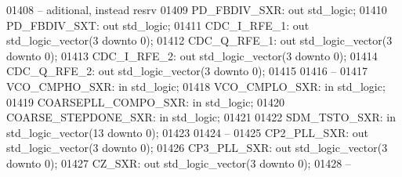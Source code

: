 \begin{DoxyCode}
01408 \textcolor{keyword}{        -- aditional, instead resrv}
01409         PD\_FBDIV\_SXR:   \textcolor{keywordflow}{out} \textcolor{comment}{std\_logic}; 
01410         PD\_FBDIV\_SXT:   \textcolor{keywordflow}{out} \textcolor{comment}{std\_logic};
01411         CDC\_I\_RFE\_1:    \textcolor{keywordflow}{out} \textcolor{comment}{std\_logic\_vector}(\textcolor{vhdllogic}{}\textcolor{vhdllogic}{3} \textcolor{keywordflow}{downto} \textcolor{vhdllogic}{}\textcolor{vhdllogic}{0});
01412         CDC\_Q\_RFE\_1:    \textcolor{keywordflow}{out} \textcolor{comment}{std\_logic\_vector}(\textcolor{vhdllogic}{}\textcolor{vhdllogic}{3} \textcolor{keywordflow}{downto} \textcolor{vhdllogic}{}\textcolor{vhdllogic}{0});
01413         CDC\_I\_RFE\_2:    \textcolor{keywordflow}{out} \textcolor{comment}{std\_logic\_vector}(\textcolor{vhdllogic}{}\textcolor{vhdllogic}{3} \textcolor{keywordflow}{downto} \textcolor{vhdllogic}{}\textcolor{vhdllogic}{0});
01414         CDC\_Q\_RFE\_2:    \textcolor{keywordflow}{out} \textcolor{comment}{std\_logic\_vector}(\textcolor{vhdllogic}{}\textcolor{vhdllogic}{3} \textcolor{keywordflow}{downto} \textcolor{vhdllogic}{}\textcolor{vhdllogic}{0});
01415 
01416 \textcolor{keyword}{        --}
01417         VCO\_CMPHO\_SXR:  \textcolor{keywordflow}{in} \textcolor{comment}{std\_logic};
01418         VCO\_CMPLO\_SXR:  \textcolor{keywordflow}{in} \textcolor{comment}{std\_logic};
01419         COARSEPLL\_COMPO\_SXR:    \textcolor{keywordflow}{in} \textcolor{comment}{std\_logic};
01420         COARSE\_STEPDONE\_SXR:    \textcolor{keywordflow}{in} \textcolor{comment}{std\_logic};
01421         
01422         SDM\_TSTO\_SXR:   \textcolor{keywordflow}{in} \textcolor{comment}{std\_logic\_vector}(\textcolor{vhdllogic}{}\textcolor{vhdllogic}{13} \textcolor{keywordflow}{downto} \textcolor{vhdllogic}{}\textcolor{vhdllogic}{0});
01423 
01424 \textcolor{keyword}{        --}
01425         CP2\_PLL\_SXR:    \textcolor{keywordflow}{out} \textcolor{comment}{std\_logic\_vector}(\textcolor{vhdllogic}{}\textcolor{vhdllogic}{3} \textcolor{keywordflow}{downto} \textcolor{vhdllogic}{}\textcolor{vhdllogic}{0});
01426         CP3\_PLL\_SXR:    \textcolor{keywordflow}{out} \textcolor{comment}{std\_logic\_vector}(\textcolor{vhdllogic}{}\textcolor{vhdllogic}{3} \textcolor{keywordflow}{downto} \textcolor{vhdllogic}{}\textcolor{vhdllogic}{0});
01427         CZ\_SXR:     \textcolor{keywordflow}{out} \textcolor{comment}{std\_logic\_vector}(\textcolor{vhdllogic}{}\textcolor{vhdllogic}{3} \textcolor{keywordflow}{downto} \textcolor{vhdllogic}{}\textcolor{vhdllogic}{0});
01428 \textcolor{keyword}{        --}

\end{DoxyCode}
